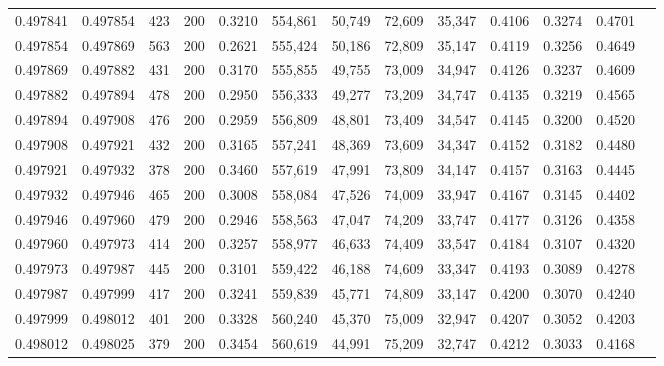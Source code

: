 \begin{tabular}{rrrrrrrrrrrrr}
0.497841 & 0.497854 &    423 & 200 &                                     0.3210 & 554,861 &  50,749 &  72,609 &  35,347 & 0.4106 & 0.3274 & 0.4701 \\
0.497854 & 0.497869 &    563 & 200 &                                     0.2621 & 555,424 &  50,186 &  72,809 &  35,147 & 0.4119 & 0.3256 & 0.4649 \\
0.497869 & 0.497882 &    431 & 200 &                                     0.3170 & 555,855 &  49,755 &  73,009 &  34,947 & 0.4126 & 0.3237 & 0.4609 \\
0.497882 & 0.497894 &    478 & 200 &                                     0.2950 & 556,333 &  49,277 &  73,209 &  34,747 & 0.4135 & 0.3219 & 0.4565 \\
0.497894 & 0.497908 &    476 & 200 &                                     0.2959 & 556,809 &  48,801 &  73,409 &  34,547 & 0.4145 & 0.3200 & 0.4520 \\
0.497908 & 0.497921 &    432 & 200 &                                     0.3165 & 557,241 &  48,369 &  73,609 &  34,347 & 0.4152 & 0.3182 & 0.4480 \\
0.497921 & 0.497932 &    378 & 200 &                                     0.3460 & 557,619 &  47,991 &  73,809 &  34,147 & 0.4157 & 0.3163 & 0.4445 \\
0.497932 & 0.497946 &    465 & 200 &                                     0.3008 & 558,084 &  47,526 &  74,009 &  33,947 & 0.4167 & 0.3145 & 0.4402 \\
0.497946 & 0.497960 &    479 & 200 &                                     0.2946 & 558,563 &  47,047 &  74,209 &  33,747 & 0.4177 & 0.3126 & 0.4358 \\
0.497960 & 0.497973 &    414 & 200 &                                     0.3257 & 558,977 &  46,633 &  74,409 &  33,547 & 0.4184 & 0.3107 & 0.4320 \\
0.497973 & 0.497987 &    445 & 200 &                                     0.3101 & 559,422 &  46,188 &  74,609 &  33,347 & 0.4193 & 0.3089 & 0.4278 \\
0.497987 & 0.497999 &    417 & 200 &                                     0.3241 & 559,839 &  45,771 &  74,809 &  33,147 & 0.4200 & 0.3070 & 0.4240 \\
0.497999 & 0.498012 &    401 & 200 &                                     0.3328 & 560,240 &  45,370 &  75,009 &  32,947 & 0.4207 & 0.3052 & 0.4203 \\
0.498012 & 0.498025 &    379 & 200 &                                     0.3454 & 560,619 &  44,991 &  75,209 &  32,747 & 0.4212 & 0.3033 & 0.4168 \\

\end{tabular}
